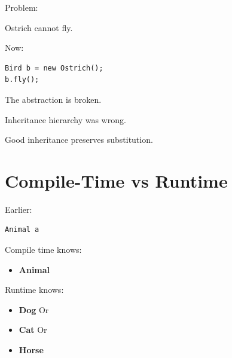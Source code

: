 \documentclass[11pt,a4paper]{book}
\begin{document}

Problem:

Ostrich cannot fly.


Now:

\begin{verbatim}
Bird b = new Ostrich();
b.fly();
\end{verbatim}


The abstraction is broken.


Inheritance hierarchy was wrong.


\begin{rosettarule}

Good inheritance preserves substitution.

\end{rosettarule}


\section{Compile-Time vs Runtime}

Earlier:

\begin{verbatim}
Animal a
\end{verbatim}


\textcolor{RosettaRoyalPurple}{Compile time} knows:
\begin{itemize}
\item \textbf{Animal}
\end{itemize}


\textcolor{RosettaDeepGreen}{Runtime} knows:
\begin{itemize}
    \item \textbf{Dog} Or
    \item \textbf{Cat} Or
    \item \textbf{Horse}
\end{itemize}
\end{document}

